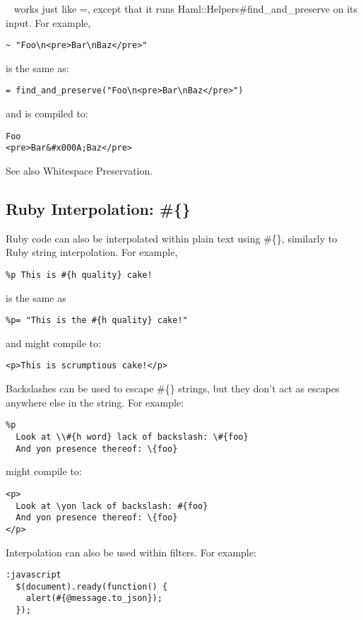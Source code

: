 \documentclass[9pt]{article}
\begin{document}
 ~ works just like =, except that it runs Haml::Helpers\#find\_and\_preserve on its input. For example,
\begin{verbatim}
~ "Foo\n<pre>Bar\nBaz</pre>"
\end{verbatim}


 is the same as:
\begin{verbatim}
= find_and_preserve("Foo\n<pre>Bar\nBaz</pre>")
\end{verbatim}


 and is compiled to:
\begin{verbatim}
Foo
<pre>Bar&#x000A;Baz</pre>
\end{verbatim}


 See also Whitespace Preservation.
\subsection{Ruby Interpolation: \#\{\}}


 Ruby code can also be interpolated within plain text using \#\{\}, similarly to Ruby string interpolation. For example,
\begin{verbatim}
%p This is #{h quality} cake!
\end{verbatim}


 is the same as
\begin{verbatim}
%p= "This is the #{h quality} cake!"
\end{verbatim}


 and might compile to:
\begin{verbatim}
<p>This is scrumptious cake!</p>
\end{verbatim}


 Backslashes can be used to escape \#\{\} strings, but they don’t act as escapes anywhere else in the string. For example:
\begin{verbatim}
%p
  Look at \\#{h word} lack of backslash: \#{foo}
  And yon presence thereof: \{foo}
\end{verbatim}


 might compile to:
\begin{verbatim}
<p>
  Look at \yon lack of backslash: #{foo}
  And yon presence thereof: \{foo}
</p>
\end{verbatim}


 Interpolation can also be used within filters. For example:
\begin{verbatim}
:javascript
  $(document).ready(function() {
    alert(#{@message.to_json});
  });
\end{verbatim}
\end{document}
